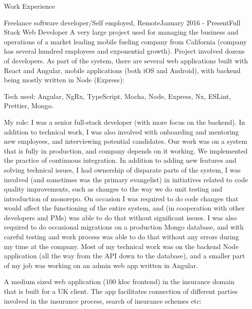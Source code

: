 \documentclass{resume}
\begin{document}
\begin{rSection}{Work Experience}
\begin{rSubsection}{Freelance software developer/Self employed, Remote}{January 2016 - Present}{Full Stack Web Developer}{}
A very large project used for managing the business and operations of a market leading mobile fueling company from California (company has several hundred employees and exponential growth). Project involved dozens of developers. As part of the system, there are several web applications built with React and Angular, mobile applications (both iOS and Android), with backend being mostly written in Node (Express):

\begin{rList}
\item Tech used: Angular, NgRx, TypeScript, Mocha, Node, Express, Nx, ESLint, Prettier, Mongo.
\item My role: I was a senior full-stack developer (with more focus on the backend). In addition to technical work, I was also involved with onboarding and mentoring new employees, and interviewing potential candidates. Our work was on a system that is fully in production, and company depends on it working. We implemented the practice of continuous integration. In addition to adding new features and solving technical issues, I had ownership of disparate parts of the system, I was involved (and sometimes was the primary evangelist) in initiatives related to code quality improvements, such as changes to the way we do unit testing and introduction of monorepo. On occasion I was required to do code changes that would affect the functioning of the entire system, and (in cooperation with other developers and PMs) was able to do that without significant issues. I was also required to do occasional migrations on a production Mongo database, and with careful testing and work process was able to do that without any errors during my time at the company. Most of my technical work was on the backend Node application (all the way from the API down to the database), and a smaller part of my job was working on an admin web app written in Angular.
\end{rList}

A medium sized web application (100 kloc frontend) in the insurance domain that is built for a UK client. The app facilitates connection of different parties involved in the insurance process, search of insurance schemes etc:


\end{rSubsection}
\end{rSection}
\end{document}
